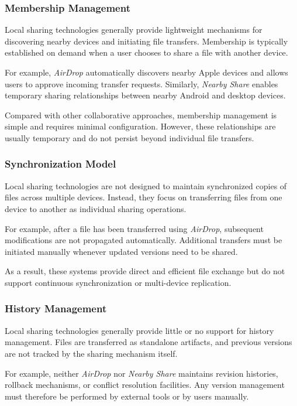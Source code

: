 \subsubsection{Membership Management}

Local sharing technologies generally provide lightweight
mechanisms for discovering nearby devices and initiating file
transfers. Membership is typically established on demand when a
user chooses to share a file with another device.

For example, \textit{AirDrop} automatically discovers nearby
Apple devices and allows users to approve incoming transfer
requests. Similarly, \textit{Nearby Share} enables temporary
sharing relationships between nearby Android and desktop
devices.

Compared with other collaborative approaches, membership
management is simple and requires minimal configuration.
However, these relationships are usually temporary and do not
persist beyond individual file transfers.

\subsubsection{Synchronization Model}

Local sharing technologies are not designed to maintain
synchronized copies of files across multiple devices. Instead,
they focus on transferring files from one device to another as
individual sharing operations.

For example, after a file has been transferred using
\textit{AirDrop}, subsequent modifications are not propagated
automatically. Additional transfers must be initiated manually
whenever updated versions need to be shared.

As a result, these systems provide direct and efficient file
exchange but do not support continuous synchronization or
multi-device replication.

\subsubsection{History Management}

Local sharing technologies generally provide little or no
support for history management. Files are transferred as
standalone artifacts, and previous versions are not tracked by
the sharing mechanism itself.

For example, neither \textit{AirDrop} nor \textit{Nearby Share}
maintains revision histories, rollback mechanisms, or conflict
resolution facilities. Any version management must therefore be
performed by external tools or by users manually.

